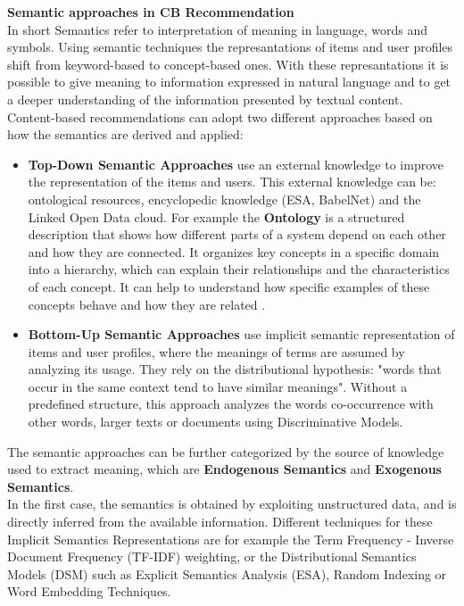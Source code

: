 \documentclass[\myFontSize,a4paper,oneside,english,hidelinks]{article}
\begin{document}
%
%
%
%
\textbf{Semantic approaches in CB Recommendation}\\
In short Semantics refer to interpretation of meaning in language, words and symbols. Using semantic techniques the represantations of items and user profiles shift from keyword-based to concept-based ones.  With these represantations it is possible to give meaning to information expressed in natural language and to get a deeper understanding of the information presented by textual content.\\
Content-based recommendations can adopt two different approaches based on how the semantics are derived and applied:
\begin{itemize}
\item \textbf{Top-Down Semantic Approaches} use an external knowledge to improve the representation of the items and users. This external knowledge can be: ontological resources, encyclopedic knowledge (ESA, BabelNet) and the Linked Open Data cloud. For example the \textbf{Ontology} is a structured description that shows how different parts of a system depend on each other and how they are connected. It organizes key concepts in a specific domain into a hierarchy, which can explain their relationships and the characteristics of each concept. It can help to understand how specific examples of these concepts behave and how they are related \cite{pub.1090632691}.
%
\item \textbf{Bottom-Up Semantic Approaches} use implicit semantic representation of items and user profiles, where the meanings of terms are assumed by analyzing its usage. They rely on the distributional hypothesis: "words that occur in the same context tend to have similar meanings". Without a predefined structure, this approach analyzes the words co-occurrence with other words, larger texts or documents using Discriminative Models.\cite{DeGemmis2015119}\\
\end{itemize}
%
%
The semantic approaches can be further categorized by the source of knowledge used to extract meaning, which are \textbf{Endogenous Semantics} and \textbf{Exogenous Semantics}.\\
In the first case, the semantics is obtained by exploiting unstructured data, and is directly inferred from the available information. Different techniques for these Implicit Semantics Representations are for example the Term Frequency - Inverse Document Frequency (TF-IDF) weighting, or the Distributional Semantics Models (DSM) such as Explicit Semantics Analysis (ESA), Random Indexing or Word Embedding Techniques.
\end{document}
